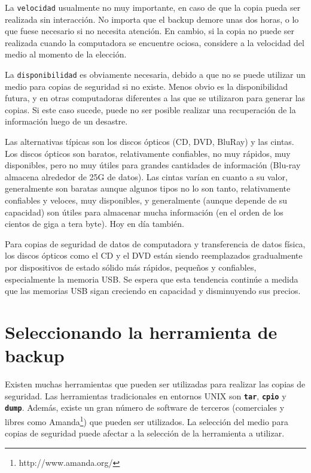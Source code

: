 \documentclass[12pt]{article}
\begin{document}
La \texttt{velocidad} usualmente no muy importante, en caso de que la 
copia pueda ser
realizada sin interacción. No importa que el backup demore unas 
dos horas, o lo que fuese necesario si no necesita atención. En cambio, si 
la copia no puede ser realizada cuando la computadora se encuentre ociosa, 
considere a la velocidad del medio al momento de la elección.

La \texttt{disponibilidad} es obviamente necesaria, debido a que no se 
puede utilizar
un medio para copias de seguridad si no existe. Menos obvio es la 
disponibilidad futura, y en otras computadoras diferentes a las que se 
utilizaron para generar las copias.
Si este caso sucede, puede no ser posible realizar una recuperación de la 
información luego de un desastre.

Las alternativas típicas son los discos ópticos (CD, DVD, BluRay) y las
cintas. Los discos ópticos son baratos, relativamente confiables, no muy 
rápidos, muy disponibles, pero no muy útiles para grandes cantidades de 
información (Blu-ray almacena alrededor de 25G de datos). Las 
cintas varían en cuanto a su valor, generalmente son baratas aunque algunos
tipos no lo son tanto, relativamente confiables y veloces, muy disponibles, 
y generalmente (aunque depende de su capacidad) son útiles para almacenar 
mucha información (en el orden de los cientos de giga a tera byte). Hoy 
en día también. 

Para copias de seguridad de datos de computadora y transferencia de datos 
física, los discos ópticos como el CD y el DVD están siendo reemplazados 
gradualmente por dispositivos de estado sólido más rápidos, pequeños y 
confiables, especialmente la memoria USB. Se espera que esta tendencia 
continúe a medida que las memorias USB sigan creciendo en capacidad y 
disminuyendo sus precios. 
	
\section*{Seleccionando la herramienta de backup}

Existen muchas herramientas que pueden ser utilizadas para realizar las 
copias de seguridad.  Las herramientas tradicionales en entornos UNIX 
son \texttt{\textbf{tar}}, \texttt{\textbf{cpio}} y \texttt{\textbf{dump}}.
 Además, existe un gran 
número de software de terceros (comerciales y libres como
 Amanda\footnote{http://www.amanda.org/}) que pueden ser 
utilizados. La selección del medio para copias de seguridad puede afectar 
a la selección de la herramienta a utilizar.
\end{document}

